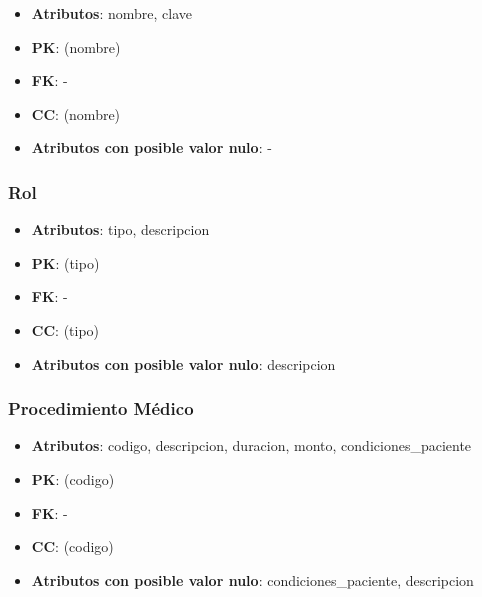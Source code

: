 \documentclass[a4paper,11pt]{article}
\begin{document}
\begin{itemize}

\item 
\textbf{Atributos}: nombre, clave

\item 
\textbf{PK}: (nombre)

\item
\textbf{FK}: - 

\item 
\textbf{CC}: (nombre)

\item 
\textbf{Atributos con posible valor nulo}: -
\end{itemize}
\subsubsection{\textbf{Rol}}

\begin{itemize}

\item 
\textbf{Atributos}: tipo, descripcion

\item 
\textbf{PK}: (tipo)

\item
\textbf{FK}: - 

\item 
\textbf{CC}: (tipo)

\item 
\textbf{Atributos con posible valor nulo}: descripcion

\end{itemize}

\subsubsection{\textbf{Procedimiento Médico}}

\begin{itemize}

\item 
\textbf{Atributos}: codigo, descripcion, duracion, monto, condiciones\_paciente

\item 
\textbf{PK}: (codigo)

\item
\textbf{FK}: - 

\item 
\textbf{CC}: (codigo)

\item 
\textbf{Atributos con posible valor nulo}: condiciones\_paciente, descripcion

\end{itemize}
\end{document}
